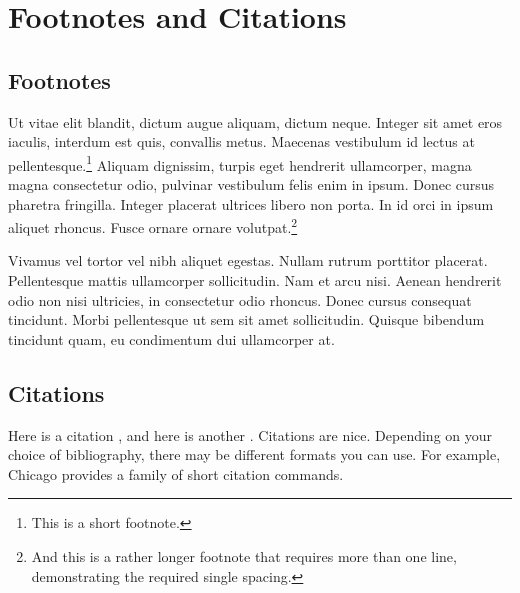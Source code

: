 \chapter{Footnotes and Citations}

\section{Footnotes}

Ut vitae elit blandit, dictum augue aliquam, dictum neque. Integer sit amet eros
iaculis, interdum est quis, convallis metus. Maecenas vestibulum id lectus at
pellentesque.\footnote{This is a short footnote.} Aliquam dignissim, turpis eget
hendrerit ullamcorper, magna magna consectetur odio, pulvinar vestibulum felis
enim in ipsum. Donec cursus pharetra fringilla. Integer placerat ultrices libero
non porta. In id orci in ipsum aliquet rhoncus. Fusce ornare ornare
volutpat.\footnote{And this is a rather longer footnote that requires more than
one line, demonstrating the required single spacing.}

Vivamus vel tortor vel nibh aliquet egestas. Nullam rutrum porttitor placerat.
Pellentesque mattis ullamcorper sollicitudin. Nam et arcu nisi. Aenean hendrerit
odio non nisi ultricies, in consectetur odio rhoncus. Donec cursus consequat
tincidunt. Morbi pellentesque ut sem sit amet sollicitudin. Quisque bibendum
tincidunt quam, eu condimentum dui ullamcorper at.

\section{Citations}

Here is a citation \cite{fake1}, and here is another \cite{fake2}. Citations are
nice. Depending on your choice of bibliography, there may be different formats
you can use. For example, Chicago provides a family of short citation commands.
